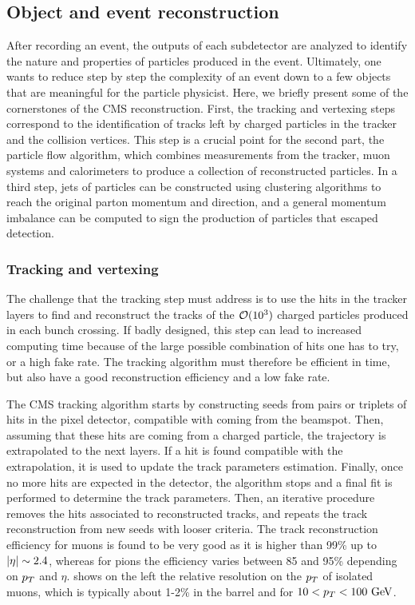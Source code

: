     \subsection{Object and event reconstruction}

    After recording an event, the outputs of each subdetector are analyzed to
    identify the nature and properties of particles produced in the event.
    Ultimately, one wants to reduce step by step the complexity of an event down
    to a few objects that are meaningful for the particle physicist. Here, we
    briefly present some of the cornerstones of the CMS reconstruction. First,
    the tracking and vertexing steps correspond to the identification of tracks
    left by charged particles in the tracker and the collision vertices. This
    step is a crucial point for the second part, the particle flow algorithm,
    which combines measurements from the tracker, muon systems and calorimeters
    to produce a collection of reconstructed particles. In a third step, jets of
    particles can be constructed using clustering algorithms to reach the
    original parton momentum and direction, and a general momentum imbalance can
    be computed to sign the production of particles that escaped detection.

        \subsubsection{Tracking and vertexing \label{sec:trackingAndVertexing}}

    The challenge that the tracking step must address is to use the hits in the
    tracker layers to find and reconstruct the tracks of the $\mathcal{O}(10^3)$
    charged particles produced in each bunch crossing. If badly designed, this
    step can lead to increased computing time because of the large possible
    combination of hits one has to try, or a high fake rate. The tracking
    algorithm must therefore be efficient in time, but also have a good
    reconstruction efficiency and a low fake rate.

    The CMS tracking algorithm \cite{CMStracking} starts by constructing seeds
    from pairs or triplets of hits in the pixel detector, compatible with coming
    from the beamspot. Then, assuming that these hits are coming from a charged
    particle, the trajectory is extrapolated to the next layers. If a hit is
    found compatible with the extrapolation, it is used to update the track
    parameters estimation. Finally, once no more hits are expected in the
    detector, the algorithm stops and a final fit is performed to determine the
    track parameters. Then, an iterative procedure removes the hits associated
    to reconstructed tracks, and repeats the track reconstruction from new seeds
    with looser criteria.  The track reconstruction efficiency for muons is
    found to be very good as it is higher than 99\% up to $\left| \eta \right| \sim 2.4$,
    whereas for pions the efficiency varies between 85 and 95\% depending on
    $p_T$ and $\eta$.  shows on the left
    the relative resolution on the $p_T$ of isolated muons, which is typically
    about 1-2\% in the barrel and for $10 < p_T < 100~\text{GeV}$.

